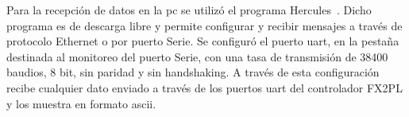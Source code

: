 



Para la recepción de datos en la \acrshort{pc} se utilizó el programa Hercules~\cite{HWGroup}. Dicho programa es de descarga libre y permite configurar y recibir mensajes a través de protocolo Ethernet o por puerto Serie. Se configuró el puerto \acrshort{uart}, en la pestaña destinada al monitoreo del puerto Serie, con una tasa de transmisión de 38400 baudios, 8 bit, sin paridad y sin handshaking. A través de esta configuración recibe cualquier dato enviado a través de los puertos \acrshort{uart} del controlador FX2PL y los muestra en formato \acrshort{ascii}.


